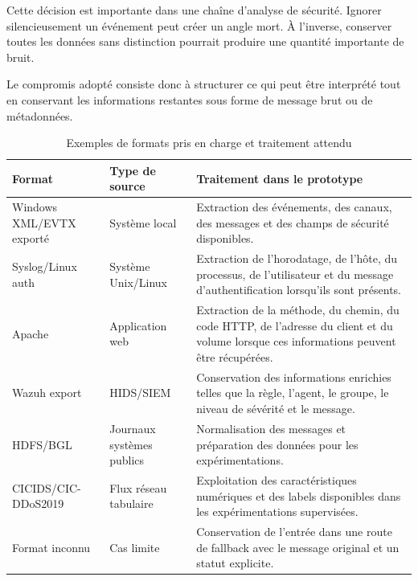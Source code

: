 Cette décision est importante dans une chaîne d'analyse de sécurité. Ignorer silencieusement un événement peut créer un angle mort. À l'inverse, conserver toutes les données sans distinction pourrait produire une quantité importante de bruit.

Le compromis adopté consiste donc à structurer ce qui peut être interprété tout en conservant les informations restantes sous forme de message brut ou de métadonnées.

\begin{table}[H]
\centering
\caption{Exemples de formats pris en charge et traitement attendu}
\label{tab:formats-implementation}
\scriptsize

\begin{tabularx}{\textwidth}{p{3cm}p{3cm}X}
\toprule
\textbf{Format} & \textbf{Type de source} & \textbf{Traitement dans le prototype} \\
\midrule

Windows XML/EVTX exporté &
Système local &
Extraction des événements, des canaux, des messages et des champs de sécurité disponibles. \\

Syslog/Linux auth &
Système Unix/Linux &
Extraction de l'horodatage, de l'hôte, du processus, de l'utilisateur et du message d'authentification lorsqu'ils sont présents. \\

Apache &
Application web &
Extraction de la méthode, du chemin, du code HTTP, de l'adresse du client et du volume lorsque ces informations peuvent être récupérées. \\

Wazuh export &
HIDS/SIEM &
Conservation des informations enrichies telles que la règle, l'agent, le groupe, le niveau de sévérité et le message. \\

HDFS/BGL &
Journaux systèmes publics &
Normalisation des messages et préparation des données pour les expérimentations. \\

CICIDS/CIC-DDoS2019 &
Flux réseau tabulaire &
Exploitation des caractéristiques numériques et des labels disponibles dans les expérimentations supervisées. \\

Format inconnu &
Cas limite &
Conservation de l'entrée dans une route de fallback avec le message original et un statut explicite. \\

\bottomrule
\end{tabularx}
\end{table}

